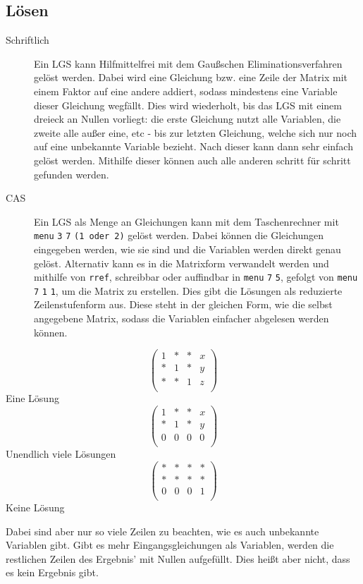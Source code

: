 \documentclass{article}
\begin{document}
\subsection{Lösen}
\begin{description}
 \item[Schriftlich] Ein LGS kann Hilfmittelfrei mit dem Gaußschen Eliminationsverfahren gelöst werden. Dabei wird eine Gleichung bzw. eine Zeile der Matrix mit einem Faktor auf eine andere addiert, sodass mindestens eine Variable dieser Gleichung wegfällt. Dies wird wiederholt, bis das LGS mit einem dreieck an Nullen vorliegt: die erste Gleichung nutzt alle Variablen, die zweite alle außer eine, etc - bis zur letzten Gleichung, welche sich nur noch auf eine unbekannte Variable bezieht. Nach dieser kann dann sehr einfach gelöst werden. Mithilfe dieser können auch alle anderen schritt für schritt gefunden werden. 
 
 \item[CAS] Ein LGS als Menge an Gleichungen kann mit dem Taschenrechner mit \texttt{menu} \textrightarrow{} \texttt{3} \textrightarrow{} \texttt{7} \textrightarrow{} \texttt{(1 oder 2)} gelöst werden. Dabei können die Gleichungen eingegeben werden, wie sie sind und die Variablen werden direkt genau gelöst. \newline
Alternativ kann es in die Matrixform verwandelt werden und mithilfe von \texttt{rref}, schreibbar oder auffindbar in \texttt{menu} \textrightarrow{} \texttt{7} \textrightarrow{} \texttt{5}, gefolgt von \texttt{menu} \textrightarrow{} \texttt{7} \textrightarrow{} \texttt{1} \textrightarrow{} \texttt{1}, um die Matrix zu erstellen. Dies gibt die Lösungen als reduzierte Zeilenstufenform aus. Diese steht in der gleichen Form, wie die selbst angegebene Matrix, sodass die Variablen einfacher abgelesen werden können.
\end{description} 
\begin{multicols}{3}
 \noindent
 \[
 \begin{pmatrix}
  1 & * & * & x \\
  * & 1 & * & y \\
  * & * & 1 & z \\
 \end{pmatrix}
 \]
 \centering Eine Lösung
 \columnbreak
 \noindent
 \[
 \begin{pmatrix}
  1 & * & * & x \\
  * & 1 & * & y \\
  0 & 0 & 0 & 0 \\
 \end{pmatrix}
 \]
 \centering Unendlich viele Lösungen  
 \columnbreak
 \noindent
 \[
 \begin{pmatrix}
  * & * & * & * \\
  * & * & * & * \\
  0 & 0 & 0 & 1 \\
 \end{pmatrix}
 \]
 \centering Keine Lösung  
\end{multicols} 
\noindent Dabei sind aber nur so viele Zeilen zu beachten, wie es auch unbekannte Variablen gibt. Gibt es mehr Eingangsgleichungen als Variablen, werden die restlichen Zeilen des Ergebnis' mit Nullen aufgefüllt. Dies heißt aber nicht, dass es kein Ergebnis gibt.
 
\end{document}
